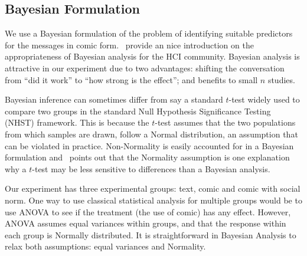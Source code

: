 

\subsection{Bayesian Formulation}
\label{sub:Bayesian Formulation}
We use a Bayesian formulation of the problem of identifying suitable predictors for the messages in comic form.~\textcite{Kay2016} provide an nice introduction on the appropriateness of Bayesian analysis for the HCI community. Bayesian analysis is attractive in our experiment due to two advantages: shifting the conversation from ``did it work'' to ``how strong is the effect''; and benefits to small $n$ studies.

Bayesian inference can sometimes differ from say a standard $t$-test widely used to compare two groups in the standard Null Hypothesis Significance Testing (NHST) framework. This is because the $t$-test assumes that the two populations from which samples are drawn, follow a Normal distribution, an assumption that can be violated in practice. Non-Normality is easily accounted for in a Bayesian formulation and~\textcite[][p. 470]{Kruschke2014} points out that the Normality assumption is one explanation why a $t$-test may be less sensitive to differences than a Bayesian analysis.

Our experiment has three experimental groups: text, comic and comic with social norm. One way to use classical statistical analysis for multiple groups would be to use ANOVA to see if the treatment (the use of comic) has any effect. However, ANOVA assumes equal variances within groups, and that the response within each group is Normally distributed.  It is straightforward in Bayesian Analysis to relax both assumptions: equal variances and Normality.

